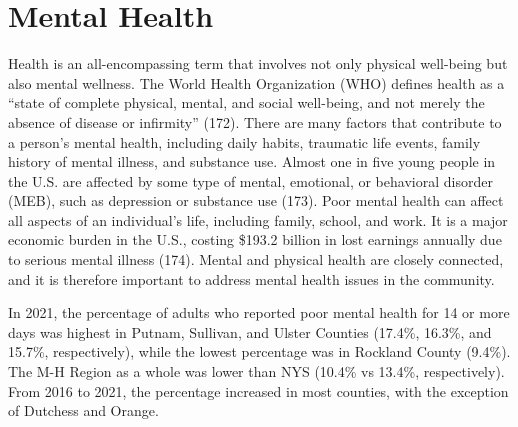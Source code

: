 \documentclass[
  english,
  letterpaper,
]{report}
\begin{document}
\section{Mental Health}\label{mental-health}

Health is an all-encompassing term that involves not only physical
well-being but also mental wellness. The World Health Organization (WHO)
defines health as a ``state of complete physical, mental, and social
well-being, and not merely the absence of disease or infirmity'' (172).
There are many factors that contribute to a person's mental health,
including daily habits, traumatic life events, family history of mental
illness, and substance use. Almost one in five young people in the U.S.
are affected by some type of mental, emotional, or behavioral disorder
(MEB), such as depression or substance use (173). Poor mental health can
affect all aspects of an individual's life, including family, school,
and work. It is a major economic burden in the U.S., costing \$193.2
billion in lost earnings annually due to serious mental illness (174).
Mental and physical health are closely connected, and it is therefore
important to address mental health issues in the community.

In 2021, the percentage of adults who reported poor mental health for 14
or more days was highest in Putnam, Sullivan, and Ulster Counties
(17.4\%, 16.3\%, and 15.7\%, respectively), while the lowest percentage
was in Rockland County (9.4\%). The M-H Region as a whole was lower than
NYS (10.4\% vs 13.4\%, respectively). From 2016 to 2021, the percentage
increased in most counties, with the exception of Dutchess and Orange.

\begin{figure}


\caption{\label{fig-adult-poormh-14ormore-percent}}

\end{figure}%
\end{document}
